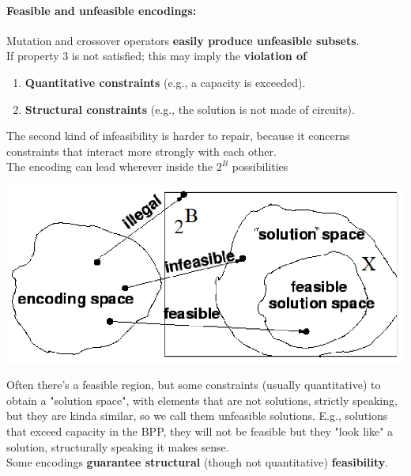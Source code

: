 \documentclass[11pt]{article}
\begin{document}
	\newpage
	
	\paragraph{Feasible and unfeasible encodings:} Mutation and crossover operators \textbf{easily produce unfeasible subsets}.\\
	
	If property 3 is not satisfied; this may imply the \textbf{violation of}
	\begin{enumerate}
		\item \textbf{Quantitative constraints} (e.g., a capacity is exceeded).\\
		
		\item \textbf{Structural constraints} (e.g., the solution is not made of circuits).\\
	\end{enumerate}
	
	The second kind of infeasibility is harder to repair, because it concerns constraints that interact more strongly with each other.\\
	
	The encoding can lead wherever inside the $2^B$ possibilities
	\begin{center}
		\includegraphics[width=0.75\columnwidth]{img/feasible1}
	\end{center}
	Often there's a feasible region, but some constraints (usually quantitative) to obtain a "solution space", with elements that are not solutions, strictly speaking, but they are kinda similar, so we call them unfeasible solutions. E.g., solutions that exceed capacity in the BPP, they will not be feasible but they "look like" a solution, structurally speaking it makes sense.\\
	
	Some encodings \textbf{guarantee structural} (though not quantitative) \textbf{feasibility}.\\
	
	\newpage
	
\end{document}
